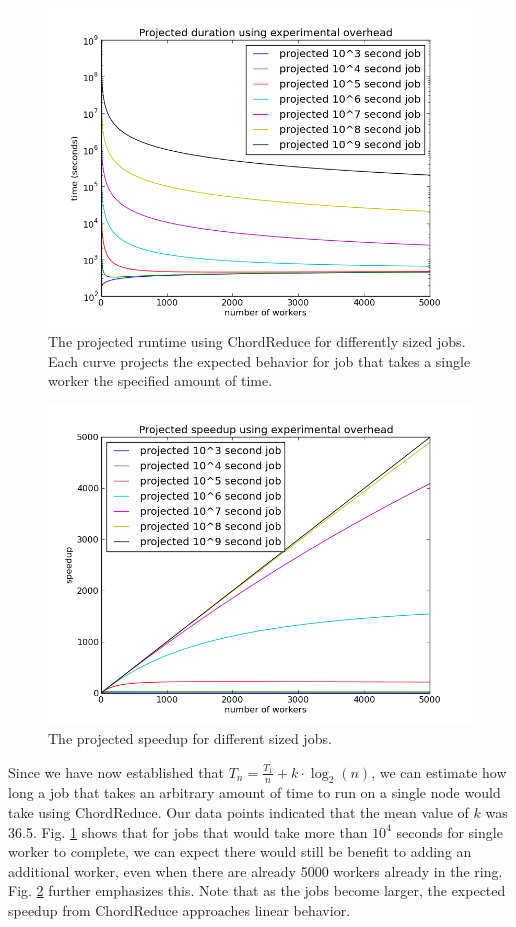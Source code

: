 \documentclass[10pt, conference, compsocconf]{IEEEtran}
\begin{document}
\begin{figure}
    \includegraphics[width=\linewidth]{projTime}
    \caption{The projected runtime using ChordReduce for differently sized jobs.  Each curve projects the expected behavior for job that takes a single worker the specified amount of time.}
    \label{projTime}
\end{figure}

\begin{figure}
    \includegraphics[width=\linewidth]{projSpeed}
    \caption{The projected speedup for different sized jobs. }
    \label{projSpeed}
\end{figure}

Since we have now established that $T_{n} = \frac{T_{1}}{n} + k \cdot \log_{2}(n)$, we can estimate how long a job that takes an arbitrary amount of time to run on a single node would take using ChordReduce.  Our data points indicated that the mean value of $k$ was 36.5.  Fig. \ref{projTime} shows that for jobs that would take more than $10^{4}$ seconds for single worker to complete, we can expect there would still be benefit to adding an additional worker, even when there are already 5000 workers already in the ring.  Fig. \ref{projSpeed} further emphasizes this. Note that as the jobs become larger, the expected speedup from ChordReduce  approaches linear behavior.
\end{document}
